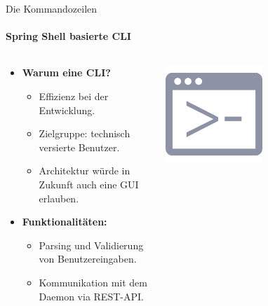\documentclass[
    ngerman,%
    authorontitle=true,
]{bfhbeamer}
\begin{document}
    \begin{frame}{Die Kommandozeilen}
        \framesubtitle{Spring Shell basierte CLI}
        \begin{columns}
            \begin{column}{0.7\textwidth}
                \begin{itemize}
                    \item \textbf{Warum eine CLI?}
                    \begin{itemize}
                        \item Effizienz bei der Entwicklung.
                        \item Zielgruppe: technisch versierte Benutzer.
                        \item Architektur würde in Zukunft auch eine GUI erlauben.
                    \end{itemize}
                    \item \textbf{Funktionalitäten:}
                    \begin{itemize}
                        \item Parsing und Validierung von Benutzereingaben.
                        \item Kommunikation mit dem Daemon via REST-API\@.
                    \end{itemize}
                \end{itemize}
            \end{column}
            \begin{column}{0.3\textwidth}
                \begin{center}
                    \includegraphics[width=0.5\textwidth]{assets/presentation/prompt}
                \end{center}
            \end{column}
        \end{columns}
    \end{frame}
\end{document}
